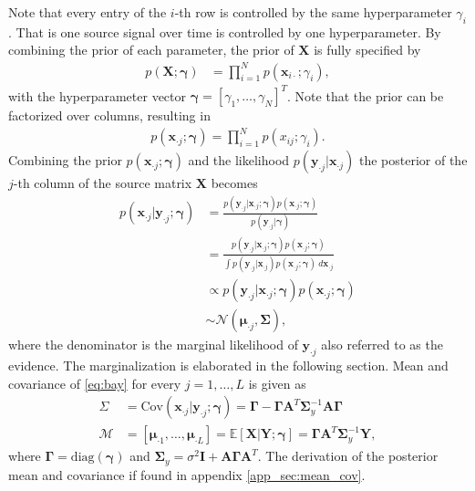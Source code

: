 Note that every entry of the $i$-th row is controlled by the same hyperparameter $\gamma_i$. 
That is one source signal over time is controlled by one hyperparameter. 
By combining the prior of each parameter, the prior of $\mathbf{X}$ is fully specified by 
\begin{align*}
p (\mathbf{X} ; \boldsymbol{\gamma}) &= \prod_{i=1}^N p (\mathbf{x}_{i \cdot} ; \gamma_i),
\end{align*}
with the hyperparameter vector $\boldsymbol{\gamma} = [\gamma_1, \dots, \gamma_N]^T$. 
Note that the prior can be factorized over columns, resulting in 
\begin{align*}
p\left(\mathbf{x}_{\cdot j} ; \boldsymbol{\gamma}\right) = \prod_{i=1}^{N} p\left( x_{ij} ; \gamma_{i}\right).
\end{align*} 
Combining the prior $p\left(\mathbf{x}_{\cdot j};\boldsymbol{\gamma}\right)$ and the likelihood $p(\mathbf{y}_{\cdot j} \vert \mathbf{x}_{\cdot j})$ the posterior of the $j$-th column of the source matrix $\mathbf{X}$ becomes
\begin{align}
p(\mathbf{x}_{\cdot j} \vert \mathbf{y}_{\cdot j} ; \boldsymbol{\gamma}) &= \frac{p(\mathbf{y}_{\cdot j} | \mathbf{x}_{\cdot j} ; \boldsymbol{\gamma}) p(\mathbf{x}_{\cdot j} ; \boldsymbol{\gamma})}{p(\mathbf{y}_{\cdot j} | \boldsymbol{\gamma})} \nonumber \\
&= \frac{p(\mathbf{y}_{\cdot j} | \mathbf{x}_{\cdot j} ; \boldsymbol{\gamma}) p(\mathbf{x}_{\cdot j} ; \boldsymbol{\gamma})}{\int p(\mathbf{y}_{\cdot j} | \mathbf{x}_{\cdot j}) p(\mathbf{x}_{\cdot j} ; \boldsymbol{\gamma}) \ d \mathbf{x}_{\cdot j}} \nonumber \\ 
&\propto p(\mathbf{y}_{\cdot j} | \mathbf{x}_{\cdot j} ; \boldsymbol{\gamma}) p(\mathbf{x}_{\cdot j} ; \boldsymbol{\gamma}) \nonumber \\
&\sim \mathcal{N}(\boldsymbol{\mu}_{\cdot j}, \boldsymbol{\Sigma}),\label{eq:bay}
\end{align}
where the denominator is the marginal likelihood of $\mathbf{y}_{\cdot j}$ also referred to as the evidence. 
The marginalization is elaborated in the following section. 
Mean and covariance of \eqref{eq:bay} for every $j = 1, \dots, L$ is given as
\begin{align}
\Sigma &= \text{Cov}(\mathbf{x}_{\cdot j} \vert \mathbf{y}_{\cdot j} ; \boldsymbol{\gamma}) = \boldsymbol{\Gamma} - \boldsymbol{\Gamma} \mathbf{A}^T \boldsymbol{\Sigma}_y^{-1} \mathbf{A} \boldsymbol{\Gamma} \label{eq:moments1} \\
\mathcal{M} &= [\boldsymbol{\mu}_{\cdot 1}, \dots, \boldsymbol{\mu}_{\cdot L}] = \mathbb{E}[\mathbf{X} \vert \mathbf{Y} ; \boldsymbol{\gamma}] = \boldsymbol{\Gamma} \mathbf{A}^T \boldsymbol{\Sigma}_y^{-1} \mathbf{Y}, \label{eq:moments2} 
\end{align}
where $\boldsymbol{\Gamma} = \text{diag}(\boldsymbol{\gamma})$ and $\boldsymbol{\Sigma}_y = \sigma^2 \mathbf{I} + \mathbf{A} \boldsymbol{\Gamma} \mathbf{A}^T$. 
The derivation of the posterior mean and covariance if found in appendix \ref{app_sec:mean_cov}.   

